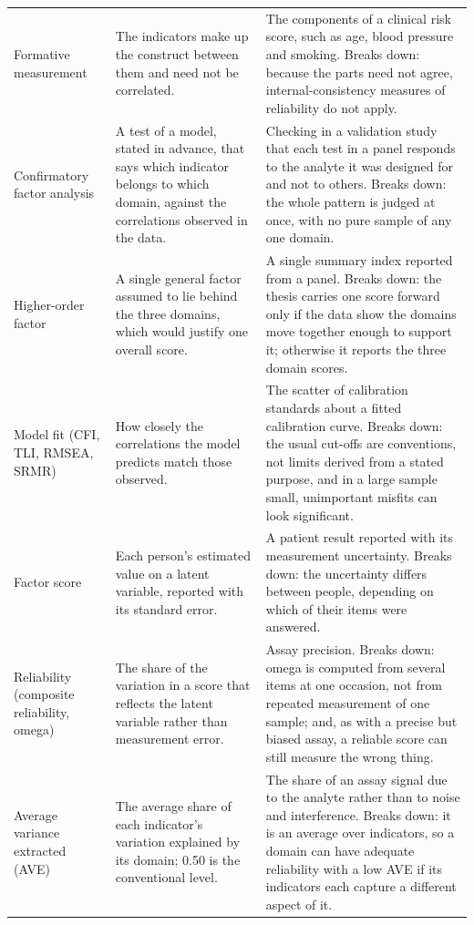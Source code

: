\begin{longtable}{>{\raggedright\arraybackslash}p{2.7cm} >{\raggedright\arraybackslash}p{4.6cm} >{\raggedright\arraybackslash}p{6.6cm}}
Formative measurement & The indicators make up the construct between them and need not be correlated. & The components of a clinical risk score, such as age, blood pressure and smoking. Breaks down: because the parts need not agree, internal-consistency measures of reliability do not apply. \\
Confirmatory factor analysis & A test of a model, stated in advance, that says which indicator belongs to which domain, against the correlations observed in the data. & Checking in a validation study that each test in a panel responds to the analyte it was designed for and not to others. Breaks down: the whole pattern is judged at once, with no pure sample of any one domain. \\
Higher-order factor & A single general factor assumed to lie behind the three domains, which would justify one overall score. & A single summary index reported from a panel. Breaks down: the thesis carries one score forward only if the data show the domains move together enough to support it; otherwise it reports the three domain scores. \\
Model fit (CFI, TLI, RMSEA, SRMR) & How closely the correlations the model predicts match those observed. & The scatter of calibration standards about a fitted calibration curve. Breaks down: the usual cut-offs are conventions, not limits derived from a stated purpose, and in a large sample small, unimportant misfits can look significant. \\
Factor score & Each person's estimated value on a latent variable, reported with its standard error. & A patient result reported with its measurement uncertainty. Breaks down: the uncertainty differs between people, depending on which of their items were answered. \\
Reliability (composite reliability, omega) & The share of the variation in a score that reflects the latent variable rather than measurement error. & Assay precision. Breaks down: omega is computed from several items at one occasion, not from repeated measurement of one sample; and, as with a precise but biased assay, a reliable score can still measure the wrong thing. \\
Average variance extracted (AVE) & The average share of each indicator's variation explained by its domain; 0.50 is the conventional level. & The share of an assay signal due to the analyte rather than to noise and interference. Breaks down: it is an average over indicators, so a domain can have adequate reliability with a low AVE if its indicators each capture a different aspect of it. \\

\end{longtable}
